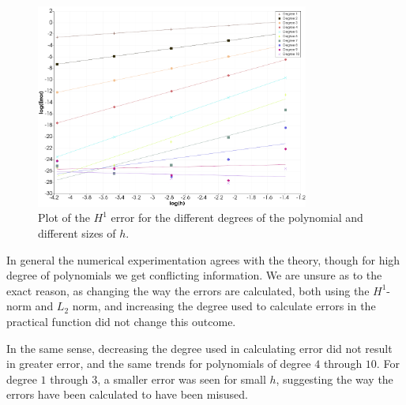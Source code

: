 \begin{figure}
    \begin{centering}
    \includegraphics[width=0.8\textwidth]{Afsnit/Application/figurer/h1-fejl_plot.png}
    \caption{Plot of the $H^1$ error for the different degrees of the polynomial and different sizes of $h$.}
    \label{fig:h1-fejl-plot}
    \end{centering}
\end{figure}

In general the numerical experimentation agrees with the theory, though 
for high degree of polynomials we get conflicting information. We are unsure 
as to the exact reason, as changing the way the errors are calculated, both 
using the $H^1$-norm and $L_2$ norm, and increasing the degree used to calculate 
errors in the practical function did not change this outcome.

In the same sense, decreasing the degree used in calculating error did 
not result in greater error, and the same trends for polynomials of degree 
$4$ through $10$. 
For degree $1$ through $3$, a smaller error was seen for small $h$, suggesting 
the way the errors have been calculated to have been misused.